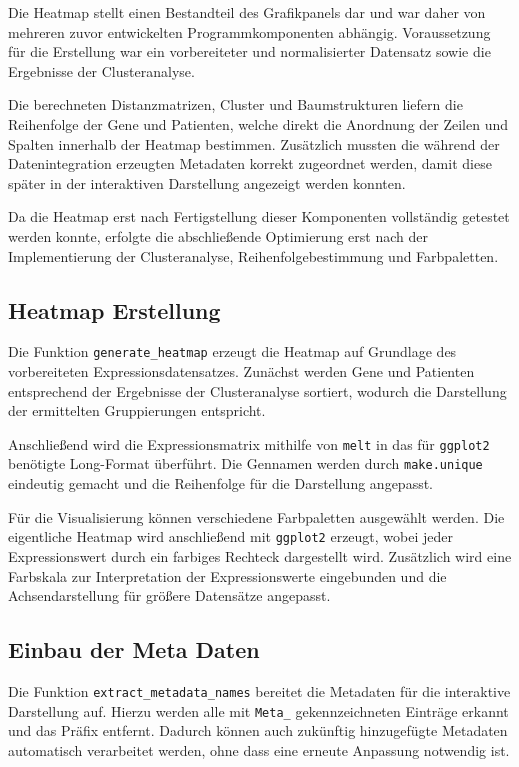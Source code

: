 \documentclass[12pt]{article}
\begin{document}
Die Heatmap stellt einen Bestandteil des Grafikpanels dar und war daher von mehreren zuvor entwickelten Programmkomponenten abhängig. Voraussetzung für die Erstellung war ein vorbereiteter und normalisierter Datensatz sowie die Ergebnisse der Clusteranalyse.

Die berechneten Distanzmatrizen, Cluster und Baumstrukturen liefern die Reihenfolge der Gene und Patienten, welche direkt die Anordnung der Zeilen und Spalten innerhalb der Heatmap bestimmen. Zusätzlich mussten die während der Datenintegration erzeugten Metadaten korrekt zugeordnet werden, damit diese später in der interaktiven Darstellung angezeigt werden konnten.

Da die Heatmap erst nach Fertigstellung dieser Komponenten vollständig getestet werden konnte, erfolgte die abschließende Optimierung erst nach der Implementierung der Clusteranalyse, Reihenfolgebestimmung und Farbpaletten.

\subsection{Heatmap Erstellung}

Die Funktion \texttt{generate\_heatmap} erzeugt die Heatmap auf Grundlage des vorbereiteten Expressionsdatensatzes. Zunächst werden Gene und Patienten entsprechend der Ergebnisse der Clusteranalyse sortiert, wodurch die Darstellung der ermittelten Gruppierungen entspricht.

Anschließend wird die Expressionsmatrix mithilfe von \texttt{melt} in das für \texttt{ggplot2} benötigte Long-Format überführt. Die Gennamen werden durch \texttt{make.unique} eindeutig gemacht und die Reihenfolge für die Darstellung angepasst.

Für die Visualisierung können verschiedene Farbpaletten ausgewählt werden. Die eigentliche Heatmap wird anschließend mit \texttt{ggplot2} erzeugt, wobei jeder Expressionswert durch ein farbiges Rechteck dargestellt wird. Zusätzlich wird eine Farbskala zur Interpretation der Expressionswerte eingebunden und die Achsendarstellung für größere Datensätze angepasst.

\subsection{Einbau der Meta Daten}

Die Funktion \texttt{extract\_metadata\_names} bereitet die Metadaten für die interaktive Darstellung auf. Hierzu werden alle mit \texttt{Meta\_} gekennzeichneten Einträge erkannt und das Präfix entfernt. Dadurch können auch zukünftig hinzugefügte Metadaten automatisch verarbeitet werden, ohne dass eine erneute Anpassung notwendig ist.
\end{document}

